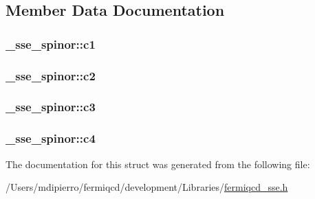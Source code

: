 \subsection{Member Data Documentation}
\hypertarget{struct__sse__spinor_ae6cee2a3ca115d5caca71964f07c0a9d}{
\subsubsection[{c1}]{ {\bf \_\-sse\_\-spinor::c1}}}
\label{struct__sse__spinor_ae6cee2a3ca115d5caca71964f07c0a9d}
\hypertarget{struct__sse__spinor_aea347e088a3466b83e4507700b9e0fad}{
\subsubsection[{c2}]{ {\bf \_\-sse\_\-spinor::c2}}}
\label{struct__sse__spinor_aea347e088a3466b83e4507700b9e0fad}
\hypertarget{struct__sse__spinor_aa7d9a43ed29e45e59cb7d9ac94bc0dd8}{
\subsubsection[{c3}]{ {\bf \_\-sse\_\-spinor::c3}}}
\label{struct__sse__spinor_aa7d9a43ed29e45e59cb7d9ac94bc0dd8}
\hypertarget{struct__sse__spinor_ae0f9c8736250608d862d3d5a5757dbc7}{
\subsubsection[{c4}]{ {\bf \_\-sse\_\-spinor::c4}}}
\label{struct__sse__spinor_ae0f9c8736250608d862d3d5a5757dbc7}


The documentation for this struct was generated from the following file:\begin{DoxyCompactItemize}
\item 
/Users/mdipierro/fermiqcd/development/Libraries/\hyperlink{fermiqcd__sse_8h}{fermiqcd\_\-sse.h}\end{DoxyCompactItemize}
